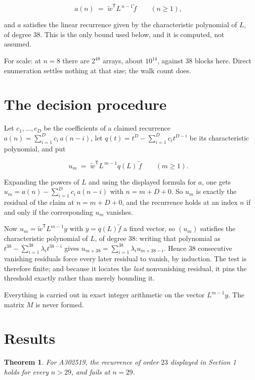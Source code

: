 \documentclass[11pt]{article}
\newtheorem{theorem}{Theorem}
\theoremstyle{definition}
\begin{document}
\[a(n) \;=\; \tilde w^{\mathsf T} L^{\,n-1} \tilde f \qquad (n \ge 1),\]

and $a$ satisfies the linear recurrence given by the characteristic polynomial of $L$, of degree $38$. This is the only bound used below, and it is computed, not assumed.

For scale: at $n = 8$ there are $2^{48}$ arrays, about $10^{14}$, against $38$ blocks here. Direct enumeration settles nothing at that size; the walk count does.

\section{The decision procedure}

Let $c_1,\dots,c_D$ be the coefficients of a claimed recurrence $a(n) = \sum_{i=1}^{D} c_i\,a(n-i)$, let $q(t) = t^{D} - \sum_{i=1}^{D} c_i t^{D-i}$ be its characteristic polynomial, and put

\[u_m \;=\; \tilde w^{\mathsf T} L^{\,m-1} q(L)\,\tilde f \qquad (m \ge 1).\]

Expanding the powers of $L$ and using the displayed formula for $a$, one gets $u_m = a(n) - \sum_{i=1}^{D} c_i\,a(n-i)$ with $n = m + D + 0$. So $u_m$ is exactly the residual of the claim at $n = m + D + 0$, and the recurrence holds at an index $n$ if and only if the corresponding $u_m$ vanishes.

Now $u_m = \tilde w^{\mathsf T} L^{m-1} y$ with $y = q(L)\tilde f$ a fixed vector, so $(u_m)$ satisfies the characteristic polynomial of $L$, of degree $38$: writing that polynomial as $t^{38} - \sum_{i=1}^{38} \lambda_i t^{38-i}$ gives $u_{m+38} = \sum_{i=1}^{38} \lambda_i u_{m+38-i}$. Hence $38$ consecutive vanishing residuals force every later residual to vanish, by induction. The test is therefore finite; and because it locates the {\itshape last} nonvanishing residual, it pins the threshold exactly rather than merely bounding it.

Everything is carried out in exact integer arithmetic on the vector $L^{m-1}y$. The matrix $M$ is never formed.

\section{Results}

\begin{theorem} For A302519, the recurrence of order $23$ displayed in Section 1 holds for every $n > 29$, and fails at $n = 29$.\end{theorem}
\end{document}
